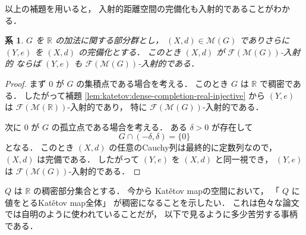 \documentclass[leqno, 12pt]{jsarticle}
\newtheorem{cor}[thm]{系}
\newcommand{\rr}{\mathbb{R}}
\newcommand{\Met}[1]{\mathscr{M}(#1)}
\newcommand{\FinitePart}[1]{\mathscr{F}(#1)}
\newcommand{\FinMet}[1]{\FinitePart{\Met{#1}}}
\begin{document}
以上の補題を用いると，
入射的距離空間の完備化も入射的であることがわかる．
%
\begin{cor}\label{cor:katetov:completion}
$G$
を
$\rr$%
の加法に関する部分群とし，
$(X, d)\in \Met{G}$
でありさらに
$(Y, e)$
を
$(X, d)$%
の完備化とする．
このとき
$(X, d)$
が
$\FinMet{G}$-入射的
ならば
$(Y, e)$
も
$\FinMet{G}$-入射的である．
\end{cor}
\begin{proof}
まず
$0$
が
$G$
の集積点である場合を考える．
このとき
$G$
は
$\rr$
で稠密である．
したがって補題
\ref{lem:katetov:dense-completion-real-injective}
から
$(Y,e)$
は
$\FinMet{\rr}$-入射的であり，
特に
$\FinMet{G}$-入射的である．


次に
$0$
が
$G$
の孤立点である場合を考える．
ある
$\delta>0$
が存在して
\[
G\cap(-\delta,\delta)=\{0\}
\]
となる．
このとき
$(X,d)$
の任意のCauchy列は最終的に定数列なので，
$(X,d)$
は完備である．
したがって
$(Y,e)$
を
$(X,d)$
と同一視でき，
$(Y,e)$
は
$\FinMet{G}$-入射的である．
\end{proof}


$Q$
は
$\rr$
の稠密部分集合とする．
今から
Kat\v{e}tov mapの空間において，
「%
$Q$%
に値をとるKat\v{e}tov map全体」
が稠密になることを示したい．
これは色々な論文では自明のように使われていることだが，%
以下で見るように多少苦労する事柄である．
\end{document}
